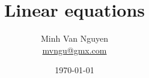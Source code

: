 \documentclass[a4paper,oneside,12pt]{article}
\begin{document}
\title{\Large\bf Linear equations}
\author{%
  Minh Van Nguyen \\
  \url{mvngu@gmx.com}
}
\date{\today}
\maketitle
\end{document}

